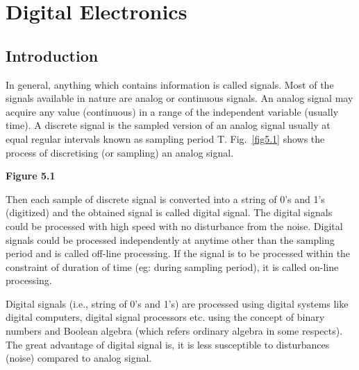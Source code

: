 \makeatletter
\def\@makechapterhead#1{%
  \vspace*{10\p@}%
  {\parindent \z@ \raggedleft \normalfont
    \ifnum \c@secnumdepth >\m@ne
      \if@mainmatter
        \LARGE\bfseries \@chapapp\space \thechapter
	\vskip 4pt
        \hrule height 2pt
        \par\nobreak
        \vskip 5\p@
      \fi
    \fi
    \interlinepenalty\@M
    \huge \bfseries #1\par\nobreak
\vskip 5pt

\hrule height 2pt
 \vskip 10\p@  
  }}
\makeatother

\chapter{Digital Electronics}\label{chap5}

\section{Introduction}\label{sec5.1}

In general, anything which contains information is called signals. Most of the signals available in nature are analog or continuous signals. An analog signal may acquire any value (continuous) in a range of the independent variable (usually time). A discrete signal is the sampled version of an analog signal usually at equal regular intervals known as sampling period T. Fig.~\ref{fig5.1} shows the process of discretising (or sampling) an analog signal.
\begin{center}
{\bf Figure 5.1}
\end{center}

Then each sample of discrete signal is converted into a string of 0's and 1's (digitized) and the obtained signal is called digital signal. The digital signals could be processed with high speed with no disturbance from the noise. Digital signals could be processed independently at anytime other than the sampling period and is called off-line processing. If the signal is to be processed within the constraint of duration of time (eg: during sampling period), it is called on-line processing.

Digital signals (i.e., string of 0's and 1's) are processed using digital systems like digital computers, digital signal processors etc. using the concept of binary numbers and Boolean algebra (which refers ordinary algebra in some respects). The great advantage of digital signal is, it is less susceptible to disturbances (noise) compared to analog signal.

